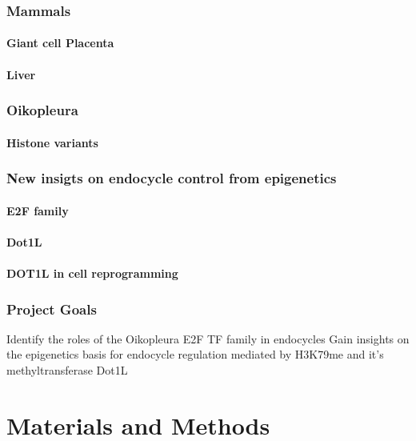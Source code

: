 \documentclass[11pt,twoside,a4paper]{report}
\begin{document}
		\subsection{Mammals}
		\subsubsection{Giant cell Placenta}
		\subsubsection{Liver}
		\subsection{Oikopleura}
		\subsubsection{Histone variants}

		\subsection{New insigts on endocycle control from epigenetics}
			\subsubsection{E2F family}
			\subsubsection{Dot1L}
			\subsubsection{DOT1L in cell reprogramming}

		\subsection{Project Goals}
		Identify the roles of the Oikopleura E2F TF family in endocycles
		Gain insights on the epigenetics basis for endocycle regulation mediated by H3K79me and it's methyltransferase Dot1L

\clearpage

\chapter{Materials and Methods}
\end{document}
